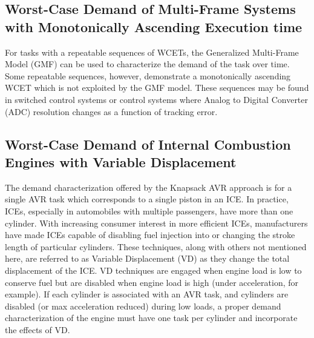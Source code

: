 \subsection{Worst-Case Demand of Multi-Frame Systems with Monotonically Ascending Execution time}

For tasks with a repeatable sequences of WCETs, the Generalized Multi-Frame Model (GMF) can be used to characterize the demand of the task over time.
Some repeatable sequences, however, demonstrate a monotonically ascending WCET which is not exploited by the GMF model.
These sequences may be found in switched control systems or control systems where Analog to Digital Converter (ADC) resolution changes as a function of tracking error.

\subsection{Worst-Case Demand of Internal Combustion Engines with Variable Displacement}

The demand characterization offered by the Knapsack AVR approach is for a single AVR task which corresponds to a single piston in an ICE.
In practice, ICEs, especially in automobiles with multiple passengers, have more than one cylinder.
With increasing consumer interest in more efficient ICEs, manufacturers have made ICEs capable of disabling fuel injection into or changing the stroke length of particular cylinders.
These techniques, along with others not mentioned here, are referred to as Variable Displacement (VD) as they change the total displacement of the ICE.
VD techniques are engaged when engine load is low to conserve fuel but are disabled when engine load is high (under acceleration, for example).
If each cylinder is associated with an AVR task, and cylinders are disabled (or max acceleration reduced) during low loads, a proper demand characterization of the engine must have one task per cylinder and incorporate the effects of VD.